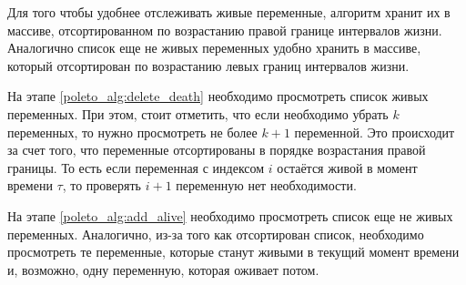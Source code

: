 Для того чтобы удобнее отслеживать живые переменные, алгоритм хранит их в массиве, отсортированном по
возрастанию правой границе интервалов жизни. Аналогично список еще не живых переменных удобно хранить в массиве,
который отсортирован по возрастанию левых границ интервалов жизни.

На этапе \ref{poleto_alg:delete_death} необходимо просмотреть список живых переменных. При этом, стоит отметить,
что если необходимо убрать $k$ переменных, то нужно просмотреть не более $k+1$ переменной. Это происходит за счет
того, что переменные отсортированы в порядке возрастания правой границы. То есть если переменная с индексом $i$
остаётся живой в момент времени $\tau$, то проверять $i + 1$ переменную нет необходимости.

На этапе \ref{poleto_alg:add_alive} необходимо просмотреть список еще не живых переменных. Аналогично,
из-за того как отсортирован список, необходимо просмотреть те переменные, которые станут живыми
в текущий момент времени и, возможно, одну переменную, которая оживает потом.

